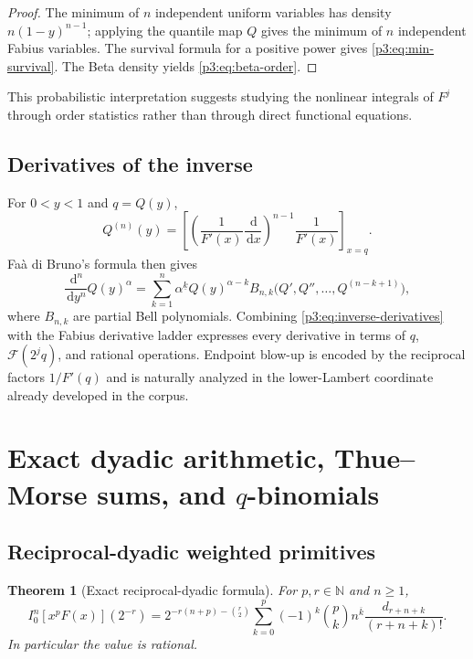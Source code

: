 \documentclass[11pt,oneside]{article}
\newtheorem{theorem}{Theorem}[section]
\theoremstyle{definition}
\theoremstyle{remark}
\newcommand{\N}{\mathbb N}
\newcommand{\dd}{\,\mathrm d}
\newcommand{\fall}[2]{#1^{\underline{#2}}}
\newcommand{\rise}[2]{#1^{\overline{#2}}}
\newcommand{\1}{\mathbf 1}
\begin{document}
\begin{proof}
The minimum of $n$ independent uniform variables has density
$n(1-y)^{n-1}$; applying the quantile map $Q$ gives the minimum of $n$ independent Fabius
variables.  The survival formula for a positive power gives \eqref{p3:eq:min-survival}.  The
Beta density yields \eqref{p3:eq:beta-order}.
\end{proof}

This probabilistic interpretation suggests studying the nonlinear integrals of $F^j$ through
order statistics rather than through direct functional equations.

\subsection{Derivatives of the inverse}

For $0<y<1$ and $q=Q(y)$,
\begin{equation}
 Q^{(n)}(y)=
 \left[\left(\frac1{F'(x)}\frac{\dd}{\dd x}\right)^{n-1}
 \frac1{F'(x)}\right]_{x=q}.                                 \label{p3:eq:inverse-derivatives}
\end{equation}
Fa\`a di Bruno's formula then gives
\begin{equation}
 \frac{\dd^n}{\dd y^n}Q(y)^\alpha
 =\sum_{k=1}^n\fall\alpha kQ(y)^{\alpha-k}
 B_{n,k}\bigl(Q',Q'',\ldots,Q^{(n-k+1)}\bigr),               \label{p3:eq:inverse-power-derivative}
\end{equation}
where $B_{n,k}$ are partial Bell polynomials.  Combining
\eqref{p3:eq:inverse-derivatives} with the Fabius derivative ladder expresses every derivative
in terms of $q$, $\mathcal F(2^jq)$, and rational operations.  Endpoint blow-up is encoded by
the reciprocal factors $1/F'(q)$ and is naturally analyzed in the lower-Lambert coordinate
already developed in the corpus.

\section{Exact dyadic arithmetic, Thue--Morse sums, and \texorpdfstring{$q$}{q}-binomials}
\label{p3:sec:dyadic}

\subsection{Reciprocal-dyadic weighted primitives}

\begin{theorem}[Exact reciprocal-dyadic formula]
\label{p3:thm:dyadic-primitive}
For $p,r\in\N$ and $n\ge1$,
\begin{equation}
 \boxed{
 I_0^n[x^pF(x)](2^{-r})
 =2^{-r(n+p)-\binom r2}
 \sum_{k=0}^{p}(-1)^k\binom pk\rise nk
 \frac{d_{r+n+k}}{(r+n+k)!}.}
 \label{p3:eq:dyadic-primitive}
\end{equation}
In particular the value is rational.
\end{theorem}
\end{document}
